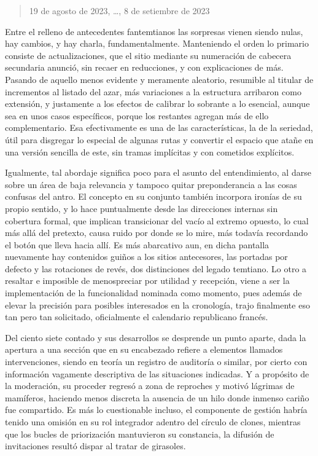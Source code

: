 \documentclass[
]{book}
\begin{document}
\begin{quote}
19 de agosto de 2023, \ldots, 8 de setiembre de 2023
\end{quote}

Entre el relleno de antecedentes fantemtianos las sorpresas vienen siendo nulas, hay cambios, y hay charla, fundamentalmente. Manteniendo el orden lo primario consiste de actualizaciones, que el sitio mediante su numeración de cabecera secundaria anunció, sin recaer en reducciones, y con explicaciones de más. Pasando de aquello menos evidente y meramente aleatorio, resumible al titular de incrementos al listado del azar, más variaciones a la estructura arribaron como extensión, y justamente a los efectos de calibrar lo sobrante a lo esencial, aunque sea en unos casos específicos, porque los restantes agregan más de ello complementario. Esa efectivamente es una de las características, la de la seriedad, útil para disgregar lo especial de algunas rutas y convertir el espacio que atañe en una versión sencilla de este, sin tramas implícitas y con cometidos explícitos.

Igualmente, tal abordaje significa poco para el asunto del entendimiento, al darse sobre un área de baja relevancia y tampoco quitar preponderancia a las cosas confusas del antro. El concepto en su conjunto también incorpora ironías de su propio sentido, y lo hace puntualmente desde las direcciones internas sin cobertura formal, que implican transicionar del vacío al extremo opuesto, lo cual más allá del pretexto, causa ruido por donde se lo mire, más todavía recordando el botón que lleva hacia allí. Es más abarcativo aun, en dicha pantalla nuevamente hay contenidos guiños a los sitios antecesores, las portadas por defecto y las rotaciones de revés, dos distinciones del legado temtiano. Lo otro a resaltar e imposible de menospreciar por utilidad y recepción, viene a ser la implementación de la funcionalidad nominada como momento, pues además de elevar la precisión para posibles interesados en la cronología, trajo finalmente eso tan pero tan solicitado, oficialmente el calendario republicano francés.

Del ciento siete contado y sus desarrollos se desprende un punto aparte, dada la apertura a una sección que en su encabezado refiere a elementos llamados intervenciones, siendo en teoría un registro de auditoría o similar, por cierto con información vagamente descriptiva de las situaciones indicadas. Y a propósito de la moderación, su proceder regresó a zona de reproches y motivó lágrimas de mamíferos, haciendo menos discreta la ausencia de un hilo donde inmenso cariño fue compartido. Es más lo cuestionable incluso, el componente de gestión habría tenido una omisión en su rol integrador adentro del círculo de clones, mientras que los bucles de priorización mantuvieron su constancia, la difusión de invitaciones resultó dispar al tratar de girasoles.
\end{document}
